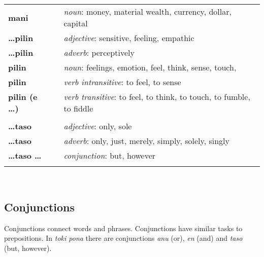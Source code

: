 \begin{supertabular}{p{2,5cm}|ll}
    \textbf{mani}             &  & \textit{noun}: money, material wealth, currency, dollar, capital                            \\ %
    \textbf{\dots pilin}      &  & \textit{adjective}: sensitive, feeling, empathic                                            \\ %
    \textbf{\dots pilin}      &  & \textit{adverb}: perceptively                                                               \\ %
    \textbf{pilin}            &  & \textit{noun}: feelings, emotion, feel, think, sense, touch,                                \\ %
    \textbf{pilin}            &  & \textit{verb intransitive}: to feel, to sense                                               \\ %
    \textbf{pilin (e \dots)}  &  & \textit{verb transitive}: to feel, to think, to touch, to fumble, to fiddle                 \\ %
                              &  &                                                                                             \\ %
    \textbf{\dots taso}       &  & \textit{adjective}: only, sole                                                              \\ %
    \textbf{\dots taso}       &  & \textit{adverb}: only, just, merely, simply, solely, singly                                 \\ %
    \textbf{\dots taso \dots} &  & \textit{conjunction}: but, however                                                          \\ %
                              &  &                                                                                             \\ %
\end{supertabular} \\
%
\newpage
\subsection*{Conjunctions}
%
%
Conjunctions connect words and phrases.
Conjunctions have similar tasks to prepositions.
In \textit{toki pona} there are conjunctions \textit{anu} (or),  \textit{en} (and) and \textit{taso} (but, however).

